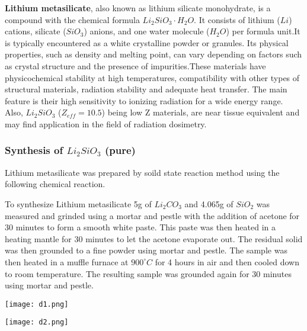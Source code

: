 \documentclass[../experiment.tex]{subfiles}
\begin{document}
    \textbf{Lithium metasilicate}, also known as lithium silicate monohydrate, is a compound with the chemical 
    formula $Li_2SiO_3·H_{2}O$. It consists of lithium ($Li$) cations, silicate ($SiO_3$) anions, and one water 
    molecule ($H_2O$) per formula unit.It is typically encountered as a white crystalline powder or granules. 
    Its physical properties, such as density and melting point, can vary depending on factors such as crystal 
    structure and the presence of impurities.These materials have physicochemical stability at high temperatures, 
    compatibility with other types of structural materials, radiation stability and adequate heat transfer. The 
    main feature is their high sensitivity to ionizing radiation for a wide energy range. Also, $Li_2SiO_3$ 
    ($Z_{eff} = 10.5$) being low Z materials, are near tissue equivalent and may find application in the field of 
    radiation dosimetry\cite{a11}. 

    \subsubsection{Synthesis of $Li_2SiO_3$ (pure)}
        Lithium metasilicate was prepared by soild state reaction method\cite{a14} using the following chemical reaction.
        \begin{center}
        \end{center}

        To synthesize Lithium metasilicate 5g of $Li_2CO_3$ and 4.065g of $SiO_2$ was measured and grinded using 
        a mortar and pestle with the addition of acetone for 30 minutes to form a smooth white paste. This paste
        was then heated in a heating mantle for 30 minutes to let the acetone evaporate out. The residual solid was 
        then grounded to a fine powder using mortar and pestle. The sample was then heated in a muffle furnace at 
        $900^{\circ}C$ for 4 hours in air and then cooled down to room temperature. The resulting sample was grounded 
        again for 30 minutes using mortar and pestle.
        \FloatBarrier\begin{multicols}{2}
            \begin{Figure}
                \centering
                \texttt{[image: d1.png]}
                \label{fig:d1}
            \end{Figure}
            \begin{Figure}
                \centering
                \texttt{[image: d2.png]}
                \label{fig:d2}
            \end{Figure}  
        \end{multicols}
\end{document}
